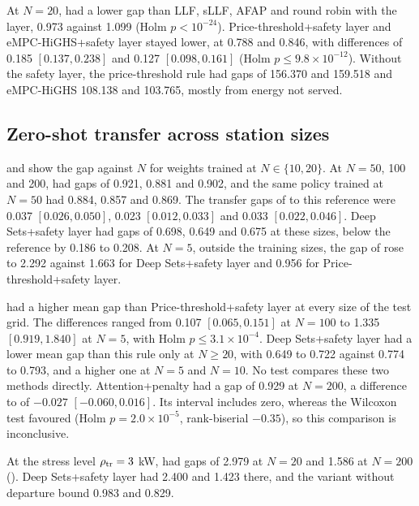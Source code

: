 At $N=20$, \method{} had a lower gap than LLF, sLLF, AFAP and round robin with the layer, 0.973 against 1.099 (Holm $p<10^{-24}$).
Price-threshold+safety layer and eMPC-HiGHS+safety layer stayed lower, at 0.788 and 0.846, with differences of 0.185 $[0.137,0.238]$ and 0.127 $[0.098,0.161]$ (Holm $p\le9.8\times10^{-12}$).
Without the safety layer, the price-threshold rule had gaps of 156.370 and 159.518 and eMPC-HiGHS 108.138 and 103.765, mostly from energy not served.


\subsection{Zero-shot transfer across station sizes}\label{sec:res-scaling}

 and  show the gap against $N$ for weights trained at $N\in\{10,20\}$.
At $N=50$, 100 and 200, \method{} had gaps of 0.921, 0.881 and 0.902, and the same policy trained at $N=50$ had 0.884, 0.857 and 0.869.
The transfer gaps of \method{} to this reference were 0.037 $[0.026,0.050]$, 0.023 $[0.012,0.033]$ and 0.033 $[0.022,0.046]$.
Deep Sets+safety layer had gaps of 0.698, 0.649 and 0.675 at these sizes, below the reference by 0.186 to 0.208.
At $N=5$, outside the training sizes, the gap of \method{} rose to 2.292 against 1.663 for Deep Sets+safety layer and 0.956 for Price-threshold+safety layer.

\method{} had a higher mean gap than Price-threshold+safety layer at every size of the test grid.
The differences ranged from 0.107 $[0.065,0.151]$ at $N=100$ to 1.335 $[0.919,1.840]$ at $N=5$, with Holm $p\le3.1\times10^{-4}$.
Deep Sets+safety layer had a lower mean gap than this rule only at $N\ge20$, with 0.649 to 0.722 against 0.774 to 0.793, and a higher one at $N=5$ and $N=10$.
No test compares these two methods directly.
Attention+penalty had a gap of 0.929 at $N=200$, a difference to \method{} of $-0.027$ $[-0.060,0.016]$.
Its interval includes zero, whereas the Wilcoxon test favoured \method{} (Holm $p=2.0\times10^{-5}$, rank-biserial $-0.35$), so this comparison is inconclusive.

At the stress level $\rho_{\mathrm{tr}}=3$ kW, \method{} had gaps of 2.979 at $N=20$ and 1.586 at $N=200$ ().
Deep Sets+safety layer had 2.400 and 1.423 there, and the variant without departure bound 0.983 and 0.829.

